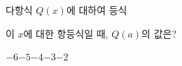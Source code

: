 다항식 $Q(x)$에 대하여 등식 \par\smallskip{}\par\smallskip\noindent 이 $x$에 대한 항등식일 때, $Q(a)$의 값은? 
\begin{choices32}{$-6$}{$-5$}{$-4$}{$-3$}{$-2$}\end{choices32}

